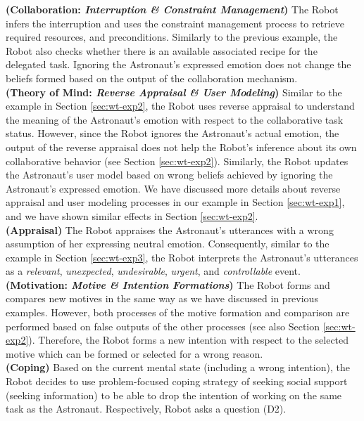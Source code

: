 \noindent\textbf{(Collaboration: \textit{Interruption \& Constraint
Management})} The Robot infers the interruption and uses the constraint
management process to retrieve required resources, and preconditions. Similarly
to the previous example, the Robot also checks whether there is an available
associated recipe for the delegated task. Ignoring the Astronaut's expressed
emotion does not change the beliefs formed based on the output of the
collaboration mechanism.\\

\noindent\textbf{(Theory of Mind: \textit{Reverse Appraisal \& User Modeling})}
Similar to the example in Section \ref{sec:wt-exp2}, the Robot uses reverse
appraisal to understand the meaning of the Astronaut's emotion with respect to
the collaborative task status. However, since the Robot ignores the Astronaut's
actual emotion, the output of the reverse appraisal does not help the Robot's
inference about its own collaborative behavior (see Section \ref{sec:wt-exp2}).
Similarly, the Robot updates the Astronaut's user model based on wrong beliefs
achieved by ignoring the Astronaut's expressed emotion. We have discussed more
details about reverse appraisal and user modeling processes in our example in
Section \ref{sec:wt-exp1}, and we have shown similar effects in Section
\ref{sec:wt-exp2}.\\

\noindent\textbf{(Appraisal)} The Robot appraises the Astronaut's utterances
with a wrong assumption of her expressing neutral emotion. Consequently, similar
to the example in Section \ref{sec:wt-exp3}, the Robot interprets the
Astronaut's utterances as a \textit{relevant}, \textit{unexpected},
\textit{undesirable}, \textit{urgent}, and \textit{controllable} event.\\

\noindent\textbf{(Motivation: \textit{Motive \& Intention Formations})} The
Robot forms and compares new motives in the same way as we have discussed in
previous examples. However, both processes of the motive formation and
comparison are performed based on false outputs of the other processes (see also
Section \ref{sec:wt-exp2}). Therefore, the Robot forms a new intention with
respect to the selected motive which can be formed or selected for a wrong
reason.\\

\noindent\textbf{(Coping)} Based on the current mental state (including a
wrong intention), the Robot decides to use problem-focused coping strategy of
seeking social support (seeking information) to be able to drop the intention of
working on the same task as the Astronaut. Respectively, Robot asks a question
(D2).\\


